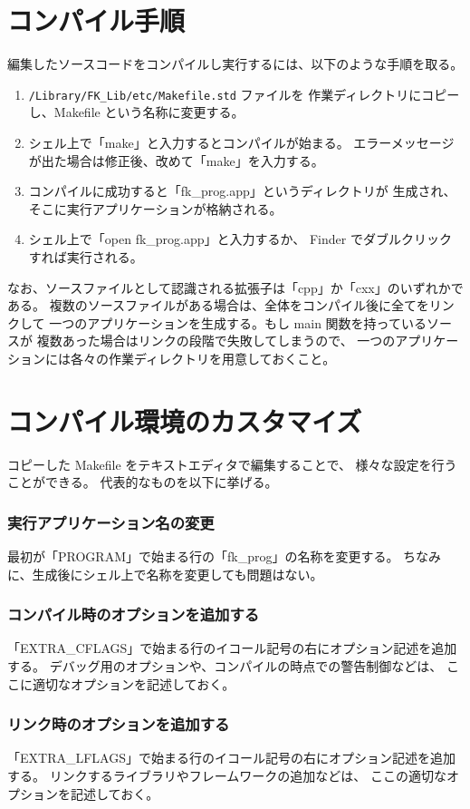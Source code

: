 \documentclass[a4j]{jarticle}
\begin{document}
\section{コンパイル手順}
編集したソースコードをコンパイルし実行するには、以下のような手順を取る。
\begin{enumerate}
 \item \verb+/Library/FK_Lib/etc/Makefile.std+ ファイルを
	作業ディレクトリにコピーし、Makefile という名称に変更する。
 \item シェル上で「make」と入力するとコンパイルが始まる。
	エラーメッセージが出た場合は修正後、改めて「make」を入力する。
 \item コンパイルに成功すると「fk\_prog.app」というディレクトリが
	生成され、そこに実行アプリケーションが格納される。
 \item シェル上で「open fk\_prog.app」と入力するか、
	Finder でダブルクリックすれば実行される。
\end{enumerate}
なお、ソースファイルとして認識される拡張子は「cpp」か「cxx」のいずれかである。
複数のソースファイルがある場合は、全体をコンパイル後に全てをリンクして
一つのアプリケーションを生成する。もし main 関数を持っているソースが
複数あった場合はリンクの段階で失敗してしまうので、
一つのアプリケーションには各々の作業ディレクトリを用意しておくこと。

\section{コンパイル環境のカスタマイズ}
コピーした Makefile をテキストエディタで編集することで、
様々な設定を行うことができる。
代表的なものを以下に挙げる。
\subsubsection*{実行アプリケーション名の変更}
最初が「PROGRAM」で始まる行の「fk\_prog」の名称を変更する。
ちなみに、生成後にシェル上で名称を変更しても問題はない。
\subsubsection*{コンパイル時のオプションを追加する}
「EXTRA\_CFLAGS」で始まる行のイコール記号の右にオプション記述を追加する。
デバッグ用のオプションや、コンパイルの時点での警告制御などは、
ここに適切なオプションを記述しておく。
\subsubsection*{リンク時のオプションを追加する}
「EXTRA\_LFLAGS」で始まる行のイコール記号の右にオプション記述を追加する。
リンクするライブラリやフレームワークの追加などは、
ここの適切なオプションを記述しておく。
\end{document}
